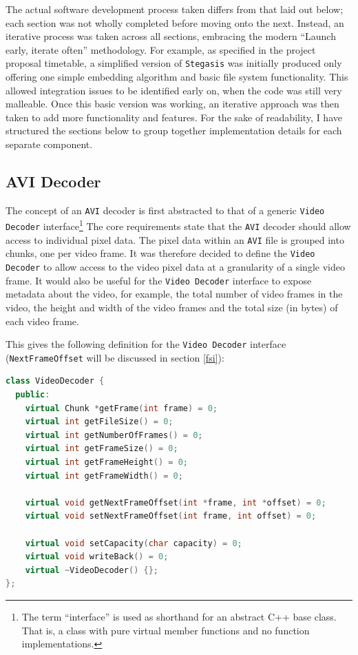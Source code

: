 \documentclass[paper=a4, fontsize=11pt,twoside]{scrartcl}    %
\numberwithin{table}{section}
\numberwithin{figure}{section}
\numberwithin{algorithm}{section}
\begin{document}
The actual software development process taken differs from that laid out below; each section was not wholly completed before moving onto the next. Instead, an iterative process was taken across all sections, embracing the modern ``Launch early, iterate often'' methodology. For example, as specified in the project proposal timetable, a simplified version of \texttt{Stegasis} was initially produced only offering one simple embedding algorithm and basic file system functionality. This allowed integration issues to be identified early on, when the code was still very malleable. Once this basic version was working, an iterative approach was then taken to add more functionality and features. For the sake of readability, I have structured the sections below to group together implementation details for each separate component.

\subsection{AVI Decoder}
\label{avidec}

The concept of an \texttt{AVI} decoder is first abstracted to that of a generic \texttt{Video Decoder} interface\footnote{The term ``interface'' is used as shorthand for an abstract C++ base class. That is, a class with pure virtual member functions and no function implementations.} The core requirements state that the \texttt{AVI} decoder should allow access to individual pixel data. The pixel data within an \texttt{AVI} file is grouped into chunks, one per video frame. It was therefore decided to define the \texttt{Video Decoder} to allow access to the video pixel data at a granularity of a single video frame. It would also be useful for the \texttt{Video Decoder} interface to expose metadata about the video, for example, the total number of video frames in the video, the height and width of the video frames and the total size (in bytes) of each video frame.

This gives the following definition for the \texttt{Video Decoder} interface (\texttt{NextFrameOffset} will be discussed in section \ref{fsi}):

\begin{lstlisting}[language=C++, caption={Video Decoder interface (\texttt{video/video\_decoder.h:15})}, frame=single]
class VideoDecoder {
  public:
    virtual Chunk *getFrame(int frame) = 0;
    virtual int getFileSize() = 0;
    virtual int getNumberOfFrames() = 0;
    virtual int getFrameSize() = 0;
    virtual int getFrameHeight() = 0;
    virtual int getFrameWidth() = 0;
	
    virtual void getNextFrameOffset(int *frame, int *offset) = 0;
    virtual void setNextFrameOffset(int frame, int offset) = 0;
   	   
    virtual void setCapacity(char capacity) = 0;
    virtual void writeBack() = 0;
    virtual ~VideoDecoder() {};
};
\end{lstlisting}
\end{document}
